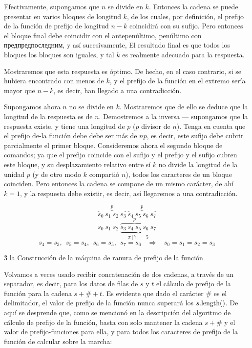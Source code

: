 Efectivamente, supongamos que $n$ se divide en $k$. Entonces la cadena se puede presentar en varios bloques de longitud $k$, de los cuales, por definición, el prefijo de la función de prefijo de longitud $n-k$ coincidirá con su sufijo. Pero entonces el bloque final debe coincidir con el antepenúltimo, penúltimo con предпредпоследним, y así sucesivamente, El resultado final es que todos los bloques los bloques son iguales, y tal $k$ es realmente adecuado para la respuesta.

Mostraremos que esta respuesta es óptimo. De hecho, en el caso contrario, si se hubiera encontrado con menos de $k$, y el prefijo de la función en el extremo sería mayor que $n-k$, es decir, han llegado a una contradicción.

Supongamos ahora $n$ no se divide en $k$. Mostraremos que de ello se deduce que la longitud de la respuesta es de $n$. Demostremos a la inversa --- supongamos que la respuesta existe, y tiene una longitud de $p$ ($p$ divisor de $n$). Tenga en cuenta que el prefijo de-la función debe debe ser más de $n p$, es decir, este sufijo debe cubrir parcialmente el primer bloque. Consideremos ahora el segundo bloque de comandos; ya que el prefijo coincide con el sufijo y el prefijo y el sufijo cubren este bloque, y su desplazamiento relativo entre sí $k$ no divide la longitud de la unidad $p$ (y de otro modo $k$ compartió $n$), todos los caracteres de un bloque coinciden. Pero entonces la cadena se compone de un mismo carácter, de ahí $k=1$, y la respuesta debe existir, es decir, así llegaremos a una contradicción.

$$ \overbrace{s_0\ s_1\ s_2\ s_3}^{p}\ \overbrace{s_4\ s_5\ s_6\ s_7}^{p} $$
$$ s_0\ s_1\ s_2\ \underbrace{\overbrace{s_3\ s_4\ s_5\ s_6}^{p}\ s_7}_{\pi[7]=5} $$
$$ s_4=s_3,\ \ s_5=s_4,\ \ s_6=s_5,\ \ s_7=s_6\ \ \ \ \Longrightarrow\ \ \ \ s_0=s_1=s_2=s_3 $$


\h3{ la Construcción de la máquina de ranura de prefijo de la función }

Volvamos a veces usado recibir concatenación de dos cadenas, a través de un separador, es decir, para los datos de filas de $s$ y $t$ el cálculo de prefijo de la función para la cadena $s+\#+t$. Es evidente que dado el carácter $\#$ es el delimitador, el valor de prefijo de la función nunca superará los $s.{\rm length}()$. De aquí se desprende que, como se mencionó en la descripción del algoritmo de cálculo de prefijo de la función, basta con solo mantener la cadena $s+\#$ y el valor de prefijo-funciones para ella, y para todos los caracteres de prefijo de la función de calcular sobre la marcha:

